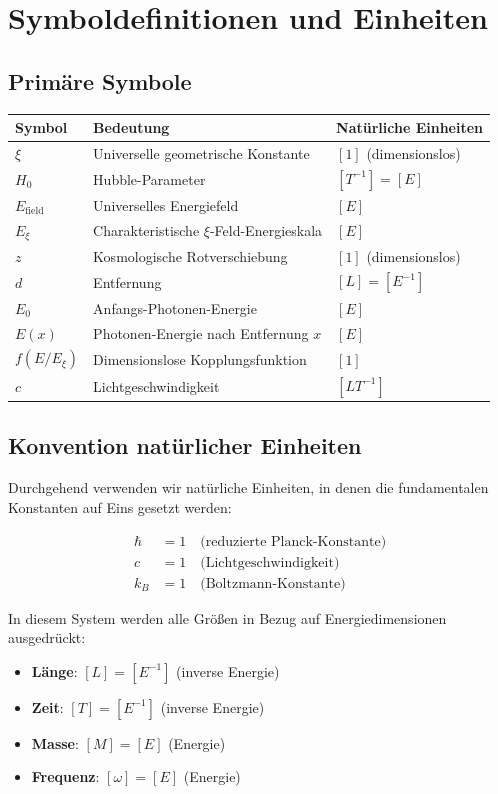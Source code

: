 	\section{Symboldefinitionen und Einheiten}
	
	\subsection{Primäre Symbole}
	
	\begin{longtable}{p{4cm}p{4cm}p{4cm}}
		\hline
		\textbf{Symbol} & \textbf{Bedeutung} & \textbf{Natürliche Einheiten} \\
		\hline
		$\xi$ & Universelle geometrische Konstante & $[1]$ (dimensionslos) \\
		$H_0$ & Hubble-Parameter & $[T^{-1}] = [E]$ \\
		$E_{\text{field}}$ & Universelles Energiefeld & $[E]$ \\
		$E_\xi$ & Charakteristische $\xi$-Feld-Energieskala & $[E]$ \\
		$z$ & Kosmologische Rotverschiebung & $[1]$ (dimensionslos) \\
		$d$ & Entfernung & $[L] = [E^{-1}]$ \\
		$E_0$ & Anfangs-Photonen-Energie & $[E]$ \\
		$E(x)$ & Photonen-Energie nach Entfernung $x$ & $[E]$ \\
		$f(E/E_\xi)$ & Dimensionslose Kopplungsfunktion & $[1]$ \\
		$c$ & Lichtgeschwindigkeit & $[LT^{-1}]$ \\
		\hline
	\end{longtable}
	
	\subsection{Konvention natürlicher Einheiten}
	
	Durchgehend verwenden wir natürliche Einheiten, in denen die fundamentalen Konstanten auf Eins gesetzt werden:
	
	\begin{align}
		\hbar &= 1 \quad \text{(reduzierte Planck-Konstante)} \\
		c &= 1 \quad \text{(Lichtgeschwindigkeit)} \\
		k_B &= 1 \quad \text{(Boltzmann-Konstante)}
	\end{align}
	
	In diesem System werden alle Größen in Bezug auf Energiedimensionen ausgedrückt:
	\begin{itemize}
		\item \textbf{Länge}: $[L] = [E^{-1}]$ (inverse Energie)
		\item \textbf{Zeit}: $[T] = [E^{-1}]$ (inverse Energie)
		\item \textbf{Masse}: $[M] = [E]$ (Energie)
		\item \textbf{Frequenz}: $[\omega] = [E]$ (Energie)
	\end{itemize}
	
